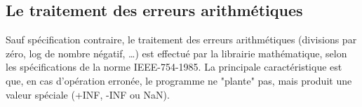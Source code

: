 \subsection*{Le traitement des erreurs arithm\'etiques}

Sauf sp\'ecification contraire, le traitement des erreurs arithm\'etiques
(divisions par z\'ero, log de nombre n\'egatif, \ldots) est effectu\'e par la
librairie math\'ematique, selon les sp\'ecifications de la norme IEEE-754-1985.
La principale caract\'eristique est que, en cas d'op\'eration erron\'ee,
le programme ne "plante" pas, mais produit une valeur sp\'eciale (+INF,
-INF ou NaN).
